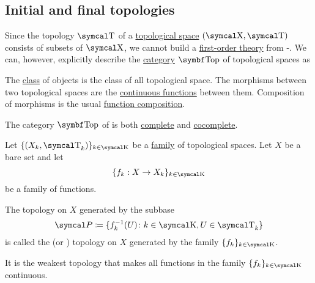\subsection{Initial and final topologies}\label{subsec:initial_final_topologies}

\begin{definition}\label{def:category_of_topological_spaces}
  Since the topology \( \CT \) of a \hyperref[def:topological_space]{topological space} \( (\CX, \CT) \) consists of subsets of \( \CX \), we cannot build a \hyperref[def:first_order_theory]{first-order theory} from -. We can, however, explicitly describe the \hyperref[def:category]{category} \( \Cat{Top} \) of topological spaces as
  \begin{RefList}
     The \hyperref[def:set_zfc]{class} of objects is the class of all topological space.
     The morphisms between two topological spaces are the \hyperref[def:global_continuity]{continuous functions} between them.
     Composition of morphisms is the usual \hyperref[def:function/composition]{function composition}.
  \end{RefList}
\end{definition}

\begin{theorem}\label{thm:top_complete_cocomplete}
  The category \( \Cat{Top} \) of is both \hyperref[def:categorical_limit]{complete} and \hyperref[def:categorical_colimit]{cocomplete}.
\end{theorem}

\begin{definition}\label{def:initial_topology}
  Let \( \{ (X_k, \CT_k) \}_{k \in \CK} \) be a \hyperref[def:indexed_family]{family} of topological spaces. Let \( X \) be a bare set and let
  \begin{equation*}
    \{ f_k: X \to X_k \}_{k \in \CK}
  \end{equation*}
  be a family of functions.

  The topology on \( X \) generated by the subbase
  \begin{equation*}
    \Cal{P} \coloneqq \{ f_k^{-1}(U) \colon k \in \CK, U \in \CT_k \}
  \end{equation*}
  is called the  (or ) topology on \( X \) generated by the family \( \{ f_k \}_{k \in \CK} \).

  It is the weakest topology that makes all functions in the family \( \{ f_k \}_{k \in \CK} \) continuous.
\end{definition}

